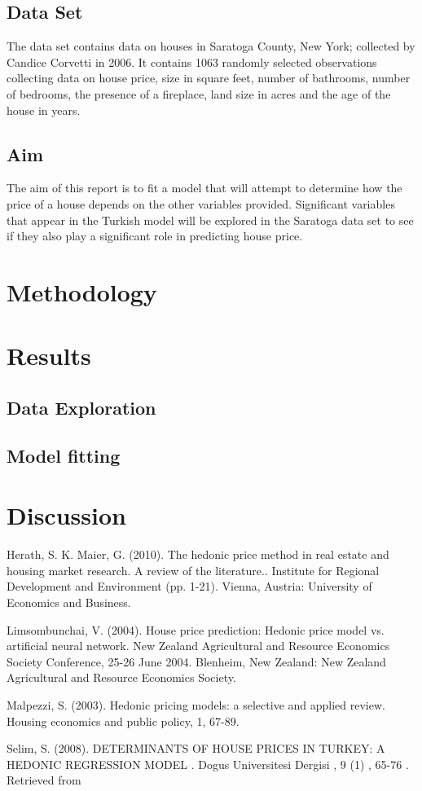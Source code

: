 \documentclass[10pt,A4,makeidx]{article}
\begin{document}
  \subsection{Data Set}
  The data set contains data on houses in Saratoga County, New York; collected by
  Candice Corvetti in 2006. It contains 1063 randomly selected observations collecting
  data on house price, size in square feet, number of bathrooms, number of bedrooms,
  the presence of a fireplace, land size in acres and the age of the house in years.
  
  \subsection{Aim}
  The aim of this report is to fit a model that will attempt to determine how 
  the price of a house depends on the other variables provided. Significant 
  variables that appear in the Turkish model will be explored in the Saratoga 
  data set to see if they also play a significant role in predicting house price.

\section{Methodology}
\section{Results}
  \subsection{Data Exploration}
  \subsection{Model fitting}
\section{Discussion}


\begin{thebibliography}{9}
Herath, S. K. Maier, G. (2010). The hedonic price method in real estate and housing market research. A review of the literature.. Institute for Regional Development and Environment (pp. 1-21). Vienna, Austria: University of Economics and Business.

Limsombunchai, V. (2004). House price prediction: Hedonic price model vs. artificial neural network. New Zealand Agricultural and Resource Economics Society Conference, 25-26 June 2004. Blenheim, New Zealand: New Zealand Agricultural and Resource Economics Society.

Malpezzi, S. (2003). Hedonic pricing models: a selective and applied review. Housing economics and public policy, 1, 67-89.

Selim, S. (2008). DETERMINANTS OF HOUSE PRICES IN TURKEY: A HEDONIC REGRESSION MODEL . Dogus Universitesi Dergisi , 9 (1) , 65-76 . Retrieved from 
\end{thebibliography}
\end{document}

